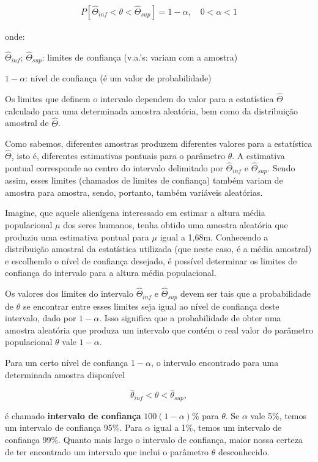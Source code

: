 \documentclass[
]{book}
\theoremstyle{definition}
\theoremstyle{definition}
\theoremstyle{definition}
\theoremstyle{remark}
\begin{document}
\begin{align*}
  P[\hat\Theta_{inf} < \theta < \hat\Theta_{sup}] = 1-\alpha, \quad 0 < \alpha < 1
\end{align*}

onde:

\(\widehat\Theta_{inf}\); \(\widehat\Theta_{sup}\): limites de confiança (v.a.'s: variam com a amostra)

\(1 - \alpha\): nível de confiança (é um valor de probabilidade)

Os limites que definem o intervalo dependem do valor para a estatística \(\hat\Theta\) calculado para uma determinada amostra aleatória, bem como da distribuição amostral de \(\hat\Theta\).

Como sabemos, diferentes amostras produzem diferentes valores para a estatística \(\hat\Theta\), isto é, diferentes estimativas pontuais para o parâmetro \(\theta\). A estimativa pontual corresponde ao centro do intervalo delimitado por \(\hat\Theta_{inf}\) e \(\hat\Theta_{sup}\). Sendo assim, esses limites (chamados de limites de confiança) também variam de amostra para amostra, sendo, portanto, também variáveis aleatórias.

Imagine, que aquele alienígena interessado em estimar a altura média populacional \(\mu\) dos seres humanos, tenha obtido uma amostra aleatória que produziu uma estimativa pontual para \(\mu\) igual a 1,68m. Conhecendo a distribuição amostral da estatística utilizada (que neste caso, é a média amostral) e escolhendo o nível de confiança desejado, é possível determinar os limites de confiança do intervalo para a altura média populacional.

Os valores dos limites do intervalo \(\hat\Theta_{inf}\) e \(\hat\Theta_{sup}\) devem ser tais que a probabilidade de \(\theta\) se encontrar entre esses limites seja igual ao nível de confiança deste intervalo, dado por \(1 - \alpha\). Isso significa que a probabilidade de obter uma amostra aleatória que produza um intervalo que contém o real valor do parâmetro populacional \(\theta\) vale \(1-\alpha\).

Para um certo nível de confiança \(1-\alpha\), o intervalo encontrado para uma determinada amostra disponível

\[\hat\theta_{inf} < \theta < \hat\theta_{sup},\]

é chamado \textbf{intervalo de confiança} \(100(1-\alpha)\)\% para \(\theta\). Se \(\alpha\) vale 5\%, temos um intervalo de confiança 95\%. Para \(\alpha\) igual a 1\%, temos um intervalo de confiança 99\%. Quanto mais largo o intervalo de confiança, maior nossa certeza de ter encontrado um intervalo que inclui o parâmetro \(\theta\) desconhecido.
\end{document}
